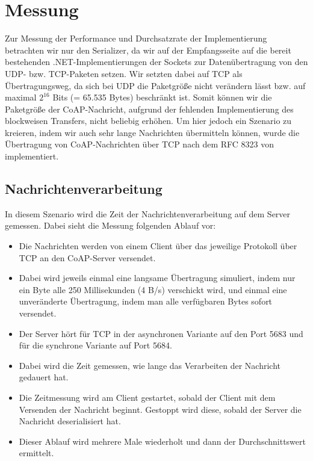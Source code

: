 \section{Messung}
\label{sec:messung}

Zur Messung der Performance und Durchsatzrate der Implementierung betrachten wir nur den Serializer, da wir auf der Empfangsseite auf die bereit bestehenden .NET-Implementierungen der Sockets zur Datenübertragung von den UDP- bzw. TCP-Paketen setzen. Wir setzten dabei auf TCP als Übertragungsweg, da sich bei UDP die Paketgröße nicht verändern lässt bzw. auf maximal $2^{16}$ Bits (= 65.535 Bytes) beschränkt ist. Somit können wir die Paketgröße der CoAP-Nachricht, aufgrund der fehlenden Implementierung des blockweisen Transfers, nicht beliebig erhöhen. Um hier jedoch ein Szenario zu kreieren, indem wir auch sehr lange Nachrichten übermitteln können, wurde die Übertragung von CoAP-Nachrichten über TCP nach dem RFC 8323 von \citeauthor{RFC8323} implementiert.

\subsection{Nachrichtenverarbeitung}
\label{subsec:nachrichtenverarbeitung}

In diesem Szenario wird die Zeit der Nachrichtenverarbeitung auf dem Server gemessen. Dabei sieht die Messung folgenden Ablauf vor:
\begin{itemize}
    \item Die Nachrichten werden von einem Client über das jeweilige Protokoll über TCP an den CoAP-Server versendet.
    \item Dabei wird jeweils einmal eine langsame Übertragung simuliert, indem nur ein Byte alle 250 Millisekunden (4 B/s) verschickt wird, und einmal eine unveränderte Übertragung, indem man alle verfügbaren Bytes sofort versendet.
    \item Der Server hört für TCP in der asynchronen Variante auf den Port 5683 und für die synchrone Variante auf Port 5684.
    \item Dabei wird die Zeit gemessen, wie lange das Verarbeiten der Nachricht gedauert hat.
    \item Die Zeitmessung wird am Client gestartet, sobald der Client mit dem Versenden der Nachricht beginnt. Gestoppt wird diese, sobald der Server die Nachricht deserialisiert hat.
    \item Dieser Ablauf wird mehrere Male wiederholt und dann der Durchschnittswert ermittelt.
\end{itemize}

